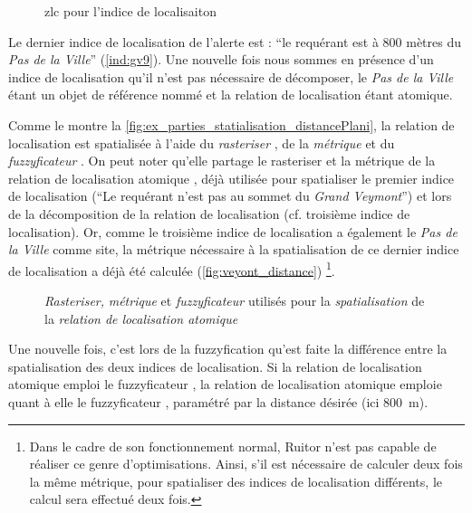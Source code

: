 \begin{figure}
  \centering
  
  \caption{\ac{zlc} pour l'indice de localisaiton }
  \label{fig:ZLC_GrandVeymont_8}
\end{figure}

Le dernier indice de localisation de l'alerte est : \enquote{le
  requérant est à 800 mètres du \emph{Pas de la Ville}}
(\ref{ind:gv9}). Une nouvelle fois nous sommes en présence d'un indice
de localisation qu'il n'est pas nécessaire de décomposer, le \emph{Pas
  de la Ville} étant un objet de référence nommé et la relation de
localisation  étant
atomique.

Comme le montre la
\autoref{fig:ex_parties_statialisation_distancePlani}, la relation de
localisation  est
spatialisée à l'aide du \emph{rasteriser} , de
la \emph{métrique}  et du
\emph{fuzzyficateur} . On peut noter qu'elle
partage le rasteriser et la métrique de la relation de localisation
atomique , déjà utilisée pour
spatialiser le premier indice de localisation (\enquote{Le requérant
  n'est pas au sommet du \emph{Grand Veymont}}) et lors de la
décomposition de la relation de localisation
 (cf. troisième indice de
localisation). Or, comme le troisième indice de localisation a
également le \emph{Pas de la Ville} comme site, la métrique nécessaire
à la spatialisation de ce dernier indice de localisation a déjà été
calculée (\autoref{fig:veyont_distance}) \footnote{Dans le cadre de
  son fonctionnement normal, Ruitor n'est pas capable de réaliser ce
  genre d'optimisations. Ainsi, s'il est nécessaire de calculer deux
  fois la même métrique, pour spatialiser des indices de localisation
  différents, le calcul sera effectué deux fois.}.

\begin{figure}
  \centering
  
  \caption{\emph{Rasteriser,} \emph{métrique} et \emph{fuzzyficateur}
    utilisés pour la \emph{spatialisation} de la \emph{relation de
      localisation atomique}
    \protect{}}
  \label{fig:ex_parties_statialisation_distancePlani}
\end{figure}

Une nouvelle fois, c'est lors de la fuzzyfication qu'est faite la
différence entre la spatialisation des deux indices de
localisation. Si la relation de localisation atomique
 emploi le fuzzyficateur
, la relation de localisation atomique
 emploie quant à
elle le fuzzyficateur , paramétré par la distance
désirée (ici \SI{800}{\meter}).


